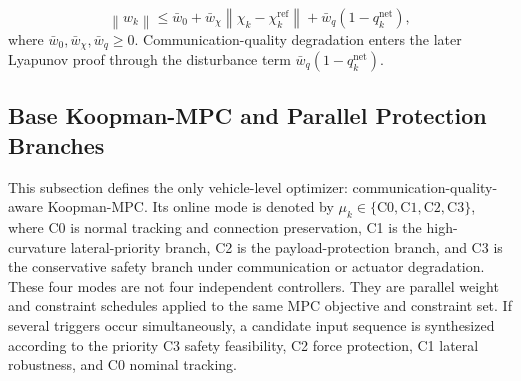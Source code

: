 \documentclass[twocolumn,3p,times,procedia]{elsarticle}
\newcommand{\norm}[1]{\left\lVert #1 \right\rVert}
\begin{document}
\begin{equation}
\norm{w_k}\le \bar w_0+\bar w_\chi\norm{\chi_k-\chi_k^\mathrm{ref}}+\bar w_q(1-q_k^{\mathrm{net}}),
\label{eq:residual_bound}
\end{equation}
where $\bar w_0,\bar w_\chi,\bar w_q\ge0$. Communication-quality degradation enters the later Lyapunov proof through the disturbance term $\bar w_q(1-q_k^{\mathrm{net}})$.

\subsection{Base Koopman-MPC and Parallel Protection Branches}

This subsection defines the only vehicle-level optimizer: communication-quality-aware Koopman-MPC. Its online mode is denoted by $\mu_k\in\{\mathrm{C0},\mathrm{C1},\mathrm{C2},\mathrm{C3}\}$, where C0 is normal tracking and connection preservation, C1 is the high-curvature lateral-priority branch, C2 is the payload-protection branch, and C3 is the conservative safety branch under communication or actuator degradation. These four modes are not four independent controllers. They are parallel weight and constraint schedules applied to the same MPC objective and constraint set. If several triggers occur simultaneously, a candidate input sequence is synthesized according to the priority C3 safety feasibility, C2 force protection, C1 lateral robustness, and C0 nominal tracking.
\end{document}

